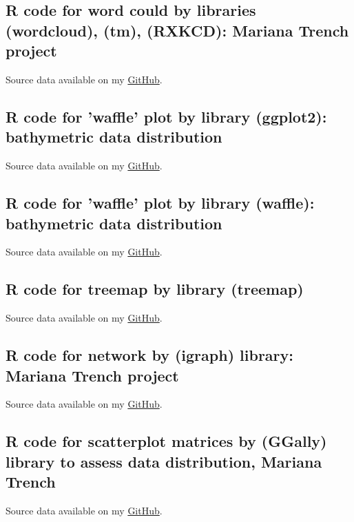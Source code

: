 \documentclass[11pt,a4paper]{report}
\begin{document}
{\begin{appendices}
\subsection{R code for word could by libraries (wordcloud), (tm), (RXKCD): Mariana Trench project}\label{R:36}
Source data available on my \href{https://github.com/paulinelemenkova/36-R-Wordcloud}{GitHub}.


\subsection{R code for 'waffle' plot by library (ggplot2): bathymetric data distribution}\label{R:37}
Source data available on my \href{https://github.com/paulinelemenkova/37-R-Waffle-Chart}{GitHub}.


\subsection{R code for 'waffle' plot by library (waffle): bathymetric data distribution}\label{R:38}
Source data available on my \href{https://github.com/paulinelemenkova/37-R-Waffle-Chart}{GitHub}.


\subsection{R code for treemap by library (treemap)}\label{R:39}
Source data available on my \href{https://github.com/paulinelemenkova/38-R-Treemap}{GitHub}.


\subsection{R code for network by (igraph) library: Mariana Trench project}\label{R:40}
Source data available on my \href{https://github.com/paulinelemenkova/39-R-Network}{GitHub}.


\subsection{R code for scatterplot matrices by (GGally) library to assess data distribution, Mariana Trench}\label{R:41}
Source data available on my \href{https://github.com/paulinelemenkova/40-R-Scatterplot-matrix}{GitHub}.

\pagebreak


\end{appendices}}
\end{document}

